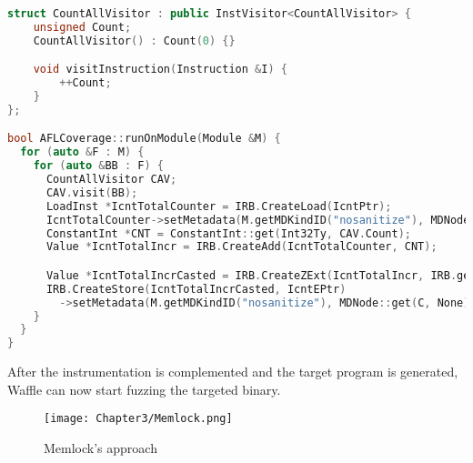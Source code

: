 \begin{lstlisting}[language=C++,style=CodeStyle,caption={Waffle's instruction counting},label={lst:waffle-visitor}]
struct CountAllVisitor : public InstVisitor<CountAllVisitor> {
    unsigned Count;
    CountAllVisitor() : Count(0) {}

    void visitInstruction(Instruction &I) {
        ++Count;
    }        
};

bool AFLCoverage::runOnModule(Module &M) {
  for (auto &F : M) {
    for (auto &BB : F) {
      CountAllVisitor CAV;
      CAV.visit(BB);
      LoadInst *IcntTotalCounter = IRB.CreateLoad(IcntPtr);
      IcntTotalCounter->setMetadata(M.getMDKindID("nosanitize"), MDNode::get(C, None));
      ConstantInt *CNT = ConstantInt::get(Int32Ty, CAV.Count);
      Value *IcntTotalIncr = IRB.CreateAdd(IcntTotalCounter, CNT);

      Value *IcntTotalIncrCasted = IRB.CreateZExt(IcntTotalIncr, IRB.getInt32Ty());
      IRB.CreateStore(IcntTotalIncrCasted, IcntEPtr)
        ->setMetadata(M.getMDKindID("nosanitize"), MDNode::get(C, None));
    }
  }
}
\end{lstlisting}

After the instrumentation is complemented and the target program is generated, Waffle can now start fuzzing the targeted binary.

\begin{figure}[!b]
    \texttt{[image: Chapter3/Memlock.png]}
    \centering
    \caption{Memlock's approach} 
    \label{fig:memlock}
\end{figure}

